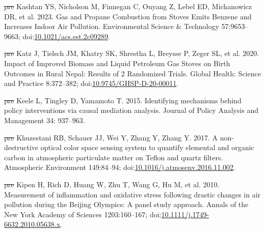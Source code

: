 \documentclass[
  letterpaper,
  DIV=11,
  numbers=noendperiod]{scrartcl}
\newlength{\cslhangindent}
\newenvironment{CSLReferences}[2] %
 {\begin{list}{}{%
  \setlength{\itemindent}{0pt} %
  \setlength{\leftmargin}{0pt} %
  \setlength{\parsep}{0pt} %
  \ifodd #1
   \setlength{\leftmargin}{\cslhangindent} %
   \setlength{\itemindent}{-1\cslhangindent} %
  \fi
  \setlength{\itemsep}{#2\baselineskip}}} %
 {\end{list}} %
\providecommand{\DIFdeltex}[1]{{\protect\color{red}\sout{#1}}}                      %
\providecommand{\DIFaddbegin}{} %
\providecommand{\DIFaddend}{} %
\providecommand{\DIFdelbegin}{} %
\providecommand{\DIFdelend}{} %
\providecommand{\DIFdel}[1]{\texorpdfstring{\DIFdeltex{#1}}{}} %
\newcommand{\DIFscaledelfig}{0.5}
\newlength{\DIFdelgraphicswidth} %
\newlength{\DIFdelgraphicsheight} %
\newcommand{\DIFaddincludegraphics}[2][]{{\color{blue}\fbox{\DIFOincludegraphics[#1]{#2}}}} %
\newcommand{\DIFdelincludegraphics}[2][]{%
\sbox{\DIFdelgraphicsbox}{\DIFOincludegraphics[#1]{#2}}%
\settoboxwidth{\DIFdelgraphicswidth}{\DIFdelgraphicsbox} %
\settoboxtotalheight{\DIFdelgraphicsheight}{\DIFdelgraphicsbox} %
\scalebox{\DIFscaledelfig}{%
\parbox[b]{\DIFdelgraphicswidth}{\usebox{\DIFdelgraphicsbox}\\[-\baselineskip] \rule{\DIFdelgraphicswidth}{0em}}\llap{\resizebox{\DIFdelgraphicswidth}{\DIFdelgraphicsheight}{%
\setlength{\unitlength}{\DIFdelgraphicswidth}%
\begin{picture}(1,1)%
\thicklines\linethickness{2pt} %
{\color[rgb]{1,0,0}\put(0,0){\framebox(1,1){}}}%
{\color[rgb]{1,0,0}\put(0,0){\line( 1,1){1}}}%
{\color[rgb]{1,0,0}\put(0,1){\line(1,-1){1}}}%
\end{picture}%
}\hspace*{3pt}}} %
} %
\DeclareRobustCommand{\DIFaddbegin}{\DIFOaddbegin \let\includegraphics\DIFaddincludegraphics} %
\DeclareRobustCommand{\DIFaddend}{\DIFOaddend \let\includegraphics\DIFOincludegraphics} %
\DeclareRobustCommand{\DIFdelbegin}{\DIFOdelbegin \let\includegraphics\DIFdelincludegraphics} %
\DeclareRobustCommand{\DIFdelend}{\DIFOaddend \let\includegraphics\DIFOincludegraphics} %
\begin{document}
\begin{CSLReferences}{1}{1}
\DIFdelbegin %
\DIFdel{pre}%
\DIFdelend \DIFaddbegin {}
\DIFaddend Kashtan YS, Nicholson M, Finnegan C, Ouyang Z, Lebel ED, Michanowicz DR,
et al. 2023. Gas and {Propane Combustion} from {Stoves Emits Benzene}
and {Increases Indoor Air Pollution}. Environmental Science \&
Technology 57:9653--9663;
doi:\href{https://doi.org/10.1021/acs.est.2c09289}{10.1021/acs.est.2c09289}.

\DIFdelbegin %
\DIFdel{pre}%
\DIFdelend \DIFaddbegin {}
\DIFaddend Katz J, Tielsch JM, Khatry SK, Shrestha L, Breysse P, Zeger SL, et al.
2020. Impact of {Improved Biomass} and {Liquid Petroleum Gas Stoves} on
{Birth Outcomes} in {Rural Nepal}: {Results} of 2 {Randomized Trials}.
Global Health: Science and Practice 8:372--382;
doi:\href{https://doi.org/10.9745/GHSP-D-20-00011}{10.9745/GHSP-D-20-00011}.

\DIFdelbegin %
\DIFdel{pre}%
\DIFdelend \DIFaddbegin {}
\DIFaddend Keele L, Tingley D, Yamamoto T. 2015. Identifying mechanisms behind
policy interventions via causal mediation analysis. Journal of Policy
Analysis and Management 34: 937--963.

\DIFdelbegin %
\DIFdel{pre}%
\DIFdelend \DIFaddbegin {}
\DIFaddend Khuzestani RB, Schauer JJ, Wei Y, Zhang Y, Zhang Y. 2017. A
non-destructive optical color space sensing system to quantify elemental
and organic carbon in atmospheric particulate matter on {Teflon} and
quartz filters. Atmospheric Environment 149:84--94;
doi:\href{https://doi.org/10.1016/j.atmosenv.2016.11.002}{10.1016/j.atmosenv.2016.11.002}.

\DIFdelbegin %
\DIFdel{pre}%
\DIFdelend \DIFaddbegin {}
\DIFaddend Kipen H, Rich D, Huang W, Zhu T, Wang G, Hu M, et al. 2010. Measurement
of inflammation and oxidative stress following drastic changes in air
pollution during the {Beijing Olympics}: A panel study approach. Annals
of the New York Academy of Sciences 1203:160--167;
doi:\href{https://doi.org/10.1111/j.1749-6632.2010.05638.x}{10.1111/j.1749-6632.2010.05638.x}.


\end{CSLReferences}
\end{document}
